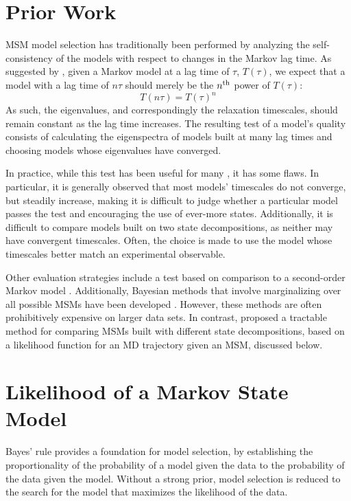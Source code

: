 \documentclass[journal=jpcbfk, layout=traditional, manuscript=article]{achemso}
\begin{document}
\section{Prior Work}
MSM model selection has traditionally been performed by analyzing the self-consistency of the models with respect to changes in the Markov lag time. As suggested by \citet{Swope2004Describing}, given a Markov model at a lag time of $\tau$, $T(\tau)$, we expect that a model with a lag time of $n\tau$ should merely be the $n^\textnormal{th}$ power of $T(\tau)$:
$$ T(n\tau) = T(\tau)^n $$ As such, the eigenvalues, and correspondingly the relaxation timescales, should remain constant as the lag time increases. The resulting test of a model's quality consists of calculating the eigenspectra of models built at many lag times and choosing models whose eigenvalues have converged. 

In practice, while this test has been useful for many \cite{Noe2009Constructing}, it has some flaws. In particular, it is generally observed that most models' timescales do not converge, but steadily increase, making it is difficult to judge whether a particular model passes the test and encouraging the use of ever-more states. Additionally, it is difficult to compare models built on two state decompositions, as neither may have convergent timescales. Often, the choice is made to use the model whose timescales better match an experimental observable.

Other evaluation strategies include a test based on comparison to a second-order Markov model \cite{Park2006Validation}. Additionally, Bayesian methods that involve marginalizing over all possible MSMs have been developed \cite{Bacallado2009Bayesian, *Bacallado2011Bayesian}. However, these methods are often prohibitively expensive on larger data sets. In contrast, \citet{Kellogg2012Evaluation} proposed a tractable method for comparing MSMs built with different state decompositions, based on a likelihood function for an MD trajectory given an MSM, discussed below.

\section{Likelihood of a Markov State Model}
Bayes' rule provides a foundation for model selection, by establishing the proportionality of the probability of a model given the data to the probability of the data given the model. Without a strong prior, model selection is reduced to the search for the model that maximizes the likelihood of the data. 
\end{document}
